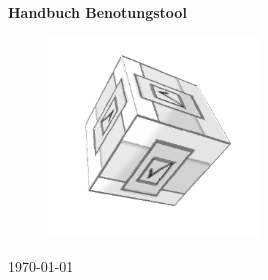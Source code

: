 \documentclass[10pt,titlepage]{article} %
\begin{document}
\begin{titlepage}
\onehalfspacing
\begin{center}
\vspace*{30mm}
\vspace{20mm}
{\LARGE \textsf {\textbf{Handbuch Benotungstool}}}
\vspace{50mm}

\begin{figure}[h]
\begin{center}
\includegraphics[width=0.5\textwidth]{benotungstool_logo_3d.png}
\end{center}
\end{figure}
\today


\end{center}
\end{titlepage}


\onehalfspacing

\pagestyle{plain}
\setcounter{page}{1}


\tableofcontents
\newpage
\listoffigures
{}
\newpage

\setcounter{page}{1}


\newpage



\newpage


\newpage


\newpage




\newpage


\newpage
\end{document}
